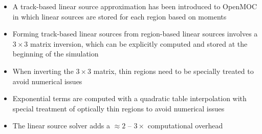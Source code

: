 \vfill
\begin{highlightsbox}[frametitle=Highlights]
\begin{itemize}
\item A track-based linear source approximation has been introduced to OpenMOC in which linear sources are stored for each region based on moments

\item Forming track-based linear sources from region-based linear sources involves a $3 \times 3$ matrix inversion, which can be explicitly computed and stored at the beginning of the simulation

\item When inverting the $3\times 3$ matrix, thin regions need to be specially treated to avoid numerical issues

\item Exponential terms are computed with a quadratic table interpolation with special treatment of optically thin regions to avoid numerical issues

\item The linear source solver adds a $\approx 2$ -- $3\times$ computational overhead

\end{itemize}
\end{highlightsbox}
\vfill